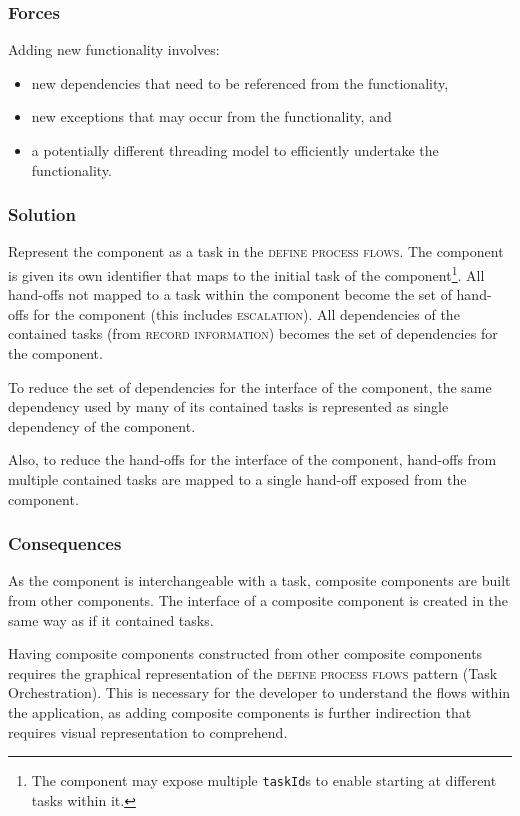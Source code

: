 \documentclass[prodmode]{style/acmlarge}
\begin{document}
\subsubsection*{Forces} Adding new functionality involves:
\begin{itemize}
  \item new dependencies that need to be referenced from the functionality,
  \item new exceptions that may occur from the functionality, and
  \item a potentially different threading model to efficiently undertake the functionality. 
\end{itemize}

\subsubsection*{\textbf{Solution}} Represent the component as a task in the
\textsc{define process flows}.  The component is given its own identifier that
maps to the initial task of the component\footnote{The component may expose
multiple \texttt{taskId}s to enable starting at different tasks within it.}. All
hand-offs not mapped to a task within the component become the set of hand-offs
for the component (this includes \textsc{escalation}).  All dependencies of the
contained tasks (from \textsc{record information}) becomes the set of
dependencies for the component.

To reduce the set of dependencies for the interface of the component, the same
dependency used by many of its contained tasks is represented as single
dependency of the component.

Also, to reduce the hand-offs for the interface of the component, hand-offs from
multiple contained tasks are mapped to a single hand-off exposed from the
component.

\subsubsection*{Consequences} As the component is interchangeable with a task,
composite components are built from other components.  The interface of a
composite component is created in the same way as if it contained tasks.

Having composite components constructed from other composite components requires
the graphical representation of the \textsc{define process flows} pattern (Task
Orchestration).  This is necessary for the developer to understand the flows
within the application, as adding composite components is further indirection
that requires visual representation to comprehend.
\end{document}
